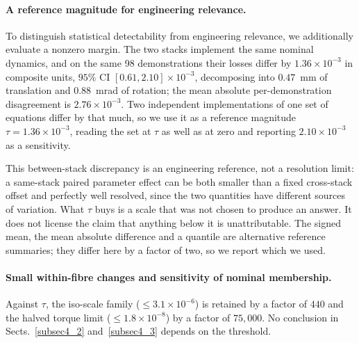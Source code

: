 \documentclass[pdflatex,iicol,sn-apa]{sn-jnl}
\theoremstyle{remark}
\begin{document}
\paragraph{A reference magnitude for engineering relevance.}
To distinguish statistical detectability from engineering relevance, we additionally evaluate a
nonzero margin. The two stacks implement the same nominal dynamics, and on the same 98 demonstrations
their losses differ by $1.36\times10^{-3}$ in composite units, $95\%$ CI
$[0.61, 2.10]\times10^{-3}$, decomposing into $0.47$~mm of translation and $0.88$~mrad of rotation;
the mean absolute per-demonstration disagreement is $2.76\times10^{-3}$. Two independent
implementations of one set of equations differ by that much, so we use it as a reference magnitude
$\tau = 1.36\times10^{-3}$, reading the set at $\tau$ as well as at zero and reporting
$2.10\times10^{-3}$ as a sensitivity.

This between-stack discrepancy is an engineering reference, not a resolution limit: a same-stack paired
parameter effect can be both smaller than a fixed cross-stack offset and perfectly well resolved,
since the two quantities have different sources of variation. What $\tau$ buys is a scale that was
not chosen to produce an answer. It does not license the claim that anything below it is
unattributable. The signed mean, the mean absolute difference and a quantile are alternative
reference summaries; they differ here by a factor of two, so we report which we used.

\paragraph{Small within-fibre changes and sensitivity of nominal membership.}
Against $\tau$, the iso-scale family ($\le 3.1\times10^{-6}$) is retained by a factor of $440$ and
the halved torque limit ($\le 1.8\times10^{-8}$) by a factor of $75{,}000$. No conclusion in
Sects.~\ref{subsec4_2} and~\ref{subsec4_3} depends on the threshold.
\end{document}
